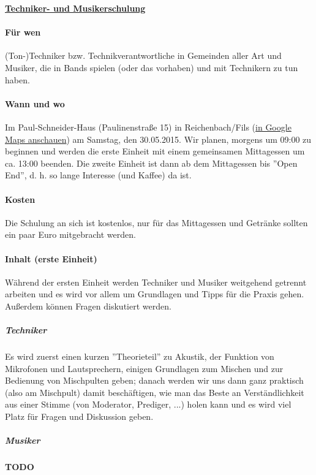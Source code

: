 \documentclass[11pt,a4paper]{article}
\begin{document}
%
%
\begin{center}
\underline{\textbf{\Large Techniker- und Musikerschulung}}
\end{center}
%
%
\paragraph{Für wen} (Ton-)Techniker bzw. Technikverantwortliche in Gemeinden aller Art und Musiker, die in Bands spielen (oder das vorhaben) und mit Technikern zu tun haben.

\paragraph{Wann und wo} Im Paul-Schneider-Haus (Paulinenstraße 15) in Reichenbach/Fils (\href{https://www.google.de/maps/place/Paul-Schneider-Haus/}{in Google Maps anschauen}) am Samstag, den 30.05.2015. Wir planen, morgens um 09:00 zu beginnen und werden die erste Einheit mit einem gemeinsamen Mittagessen um ca. 13:00 beenden. Die zweite Einheit ist dann ab dem Mittagessen bis ''Open End'', d. h. so lange Interesse (und Kaffee) da ist.

\paragraph{Kosten} Die Schulung an sich ist kostenlos, nur für das Mittagessen und Getränke sollten ein paar Euro mitgebracht werden.

\paragraph{Inhalt (erste Einheit)} Während der ersten Einheit werden Techniker und Musiker weitgehend getrennt arbeiten und es wird vor allem um Grundlagen und Tipps für die Praxis gehen. Außerdem können Fragen diskutiert werden.
%
\setlength{\parskip}{-15pt}
%
\subparagraph{Techniker} Es wird zuerst einen kurzen ''Theorieteil'' zu Akustik, der Funktion von Mikrofonen und Lautsprechern, einigen Grundlagen zum Mischen und zur Bedienung von Mischpulten geben; danach werden wir uns dann ganz praktisch (also am Mischpult) damit beschäftigen, wie man das Beste an Verständlichkeit aus einer Stimme (von Moderator, Prediger, ...) holen kann und es wird viel Platz für Fragen und Diskussion geben.
%
\subparagraph{Musiker} \textbf{TODO} %
\end{document}
